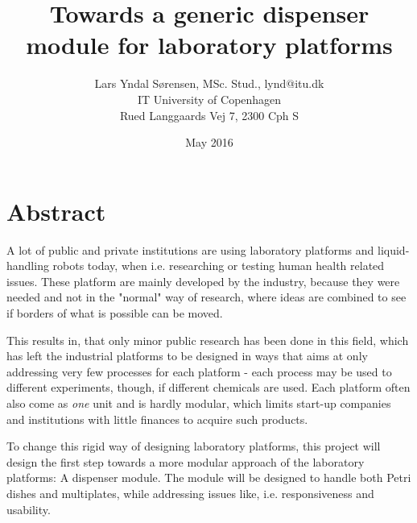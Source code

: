 \documentclass[10pt,a4paper]{article}
\title{Towards a generic dispenser module for laboratory platforms}
\author{
	Lars Yndal Sørensen, MSc. Stud., lynd@itu.dk\\
	IT University of Copenhagen\\
	Rued Langgaards Vej 7, 2300 Cph S\\
}
\date{May 2016}
\begin{document}
	\begin{titlepage}
		\maketitle
		\thispagestyle{empty}
	\end{titlepage}

	\tableofcontents
	\newpage
	
	
	
	\section{Abstract}
		A lot of public and private institutions are using laboratory platforms and liquid-handling robots today, when i.e. researching or testing human health related issues. These platform are mainly developed by the industry, because they were needed and not in the "normal" way of research, where ideas are combined to see if borders of what is possible can be moved.
		
		This results in, that only minor public research has been done in this field, which has left the industrial platforms to be designed in ways that aims at only addressing very few processes for each platform - each process may be used to different experiments, though, if different chemicals are used. Each platform often also come as \textit{one} unit and is hardly modular, which limits start-up companies and institutions with little finances to acquire such products.
		
		To change this rigid way of designing laboratory platforms, this project will design the first step towards a more modular approach of the laboratory platforms: A dispenser module. The module will be designed to handle both Petri dishes and multiplates, while addressing issues like, i.e. responsiveness and usability.
		
	\newpage
	
	
	
	
	
	
	
	
	
	
	
	
	
		
\end{document}
